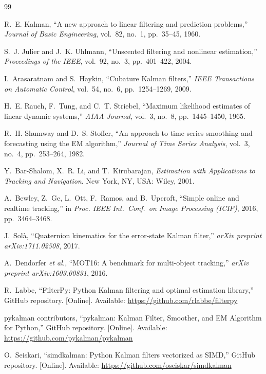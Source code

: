 \documentclass[10pt,conference]{IEEEtran}
\begin{document}
\begingroup
\small
\begin{thebibliography}{99}

 R.~E. Kalman, ``A new approach to linear filtering and
prediction problems,'' \emph{Journal of Basic Engineering}, vol.~82, no.~1,
pp.~35--45, 1960.

 S.~J. Julier and J.~K. Uhlmann, ``Unscented
filtering and nonlinear estimation,'' \emph{Proceedings of the IEEE},
vol.~92, no.~3, pp.~401--422, 2004.

 I.~Arasaratnam and S.~Haykin, ``Cubature
Kalman filters,'' \emph{IEEE Transactions on Automatic Control}, vol.~54,
no.~6, pp.~1254--1269, 2009.

 H.~E. Rauch, F.~Tung, and C.~T. Striebel,
``Maximum likelihood estimates of linear dynamic systems,'' \emph{AIAA
Journal}, vol.~3, no.~8, pp.~1445--1450, 1965.

 R.~H. Shumway and D.~S. Stoffer, ``An approach to time
series smoothing and forecasting using the EM algorithm,'' \emph{Journal of
Time Series Analysis}, vol.~3, no.~4, pp.~253--264, 1982.

 Y.~Bar-Shalom, X.~R. Li, and T.~Kirubarajan,
\emph{Estimation with Applications to Tracking and Navigation}. New York,
NY, USA: Wiley, 2001.

 A.~Bewley, Z.~Ge, L.~Ott, F.~Ramos, and B.~Upcroft,
``Simple online and realtime tracking,'' in \emph{Proc. IEEE Int.\ Conf.\ on
Image Processing (ICIP)}, 2016, pp.~3464--3468.

 J.~Sol\`a, ``Quaternion kinematics for the
error-state Kalman filter,'' \emph{arXiv preprint arXiv:1711.02508}, 2017.

 A.~Dendorfer \emph{et al.}, ``MOT16: A benchmark for
multi-object tracking,'' \emph{arXiv preprint arXiv:1603.00831}, 2016.

 R.~Labbe, ``FilterPy: Python Kalman filtering and optimal
estimation library,'' GitHub repository. [Online]. Available:
\url{https://github.com/rlabbe/filterpy}

 pykalman contributors, ``pykalman: Kalman Filter, Smoother,
and EM Algorithm for Python,'' GitHub repository. [Online]. Available:
\url{https://github.com/pykalman/pykalman}

 O.~Seiskari, ``simdkalman: Python Kalman filters
vectorized as SIMD,'' GitHub repository. [Online]. Available:
\url{https://github.com/oseiskar/simdkalman}


\end{thebibliography}
\end{document}
